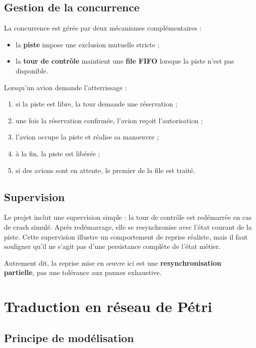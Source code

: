 \documentclass[11pt,a4paper]{article}
\begin{document}
\subsection{Gestion de la concurrence}

La concurrence est gérée par deux mécanismes complémentaires :
\begin{itemize}
    \item la \textbf{piste} impose une exclusion mutuelle stricte ;
    \item la \textbf{tour de contrôle} maintient une \textbf{file FIFO} lorsque la piste n'est pas disponible.
\end{itemize}

Lorsqu'un avion demande l'atterrissage :
\begin{enumerate}
    \item si la piste est libre, la tour demande une réservation ;
    \item une fois la réservation confirmée, l'avion reçoit l'autorisation ;
    \item l'avion occupe la piste et réalise sa manœuvre ;
    \item à la fin, la piste est libérée ;
    \item si des avions sont en attente, le premier de la file est traité.
\end{enumerate}

\subsection{Supervision}

Le projet inclut une supervision simple : la tour de contrôle est redémarrée en cas de crash simulé. Après redémarrage, elle se resynchronise avec l'état courant de la piste. Cette supervision illustre un comportement de reprise réaliste, mais il faut souligner qu'il ne s'agit pas d'une persistance complète de l'état métier.

Autrement dit, la reprise mise en œuvre ici est une \textbf{resynchronisation partielle}, pas une tolérance aux pannes exhaustive.

\section{Traduction en réseau de Pétri}

\subsection{Principe de modélisation}
\end{document}
